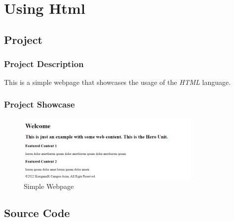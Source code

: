 \section{Using Html}\label{sec:html}

\subsection{Project}

\subsubsection*{Project Description}
This is a simple webpage that showcases the usage of the \textit{HTML} language.

\subsubsection*{Project Showcase}
\begin{figure}[H]
    \centering
    \includegraphics[width=0.8\textwidth]{res/html.png}
    \caption{Simple Webpage}
    \label{fig:html}
\end{figure}

\subsection{Source Code}
\inputminted[linenos, breaklines, encoding=utf8, frame=lines]{html}{./code/html.html}

\pagebreak

